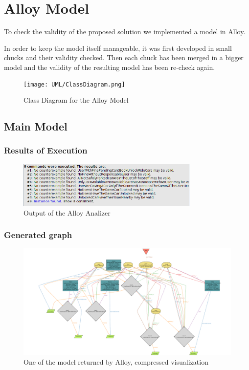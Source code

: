 \documentclass[11pt]{article} %
\begin{document}
\newpage
\section{Alloy Model}

To check the validity of the proposed solution we implemented a model in Alloy.

In order to keep the model itself manageable, it was first developed in small chucks and their validity checked. Then each chuck has been merged in a bigger model and the validity of the resulting model has been re-check again.

\begin{figure}[H]
	\centering
	\texttt{[image: UML/ClassDiagram.png]}
	\caption{Class Diagram for the Alloy Model}
\end{figure}

\subsection{Main Model}



\subsubsection{Results of Execution}

\begin{figure}[H]
	\centering
	\includegraphics[width=0.8\textwidth]{Alloy/ConsistentStatic.png}
	\caption{Output of the Alloy Analizer}
\end{figure}

\subsubsection{Generated graph}

\begin{figure}[H]
	\centering
	\includegraphics[width=1\textwidth]{Alloy/Complete.png}
	\caption{One of the model returned by Alloy, compressed visualization}
\end{figure}
\end{document}
